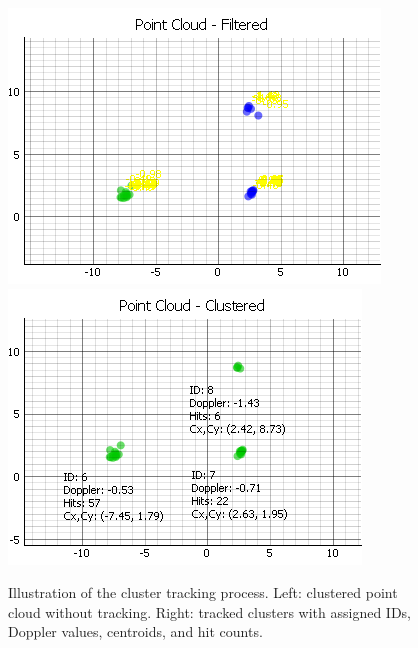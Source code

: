 \begin{figure}[!htbp]
    \centering
    \includegraphics[width=0.48\linewidth]{images/TrackClusterPointCloud.png}
    \includegraphics[width=0.48\linewidth]{images/TrackCluster.png}
    \caption{Illustration of the cluster tracking process. Left: clustered point cloud without tracking. Right: tracked clusters with assigned IDs, Doppler values, centroids, and hit counts.}
    \label{fig:track_cluster_pointcloud}
\end{figure}

\vspace{10\baselineskip}